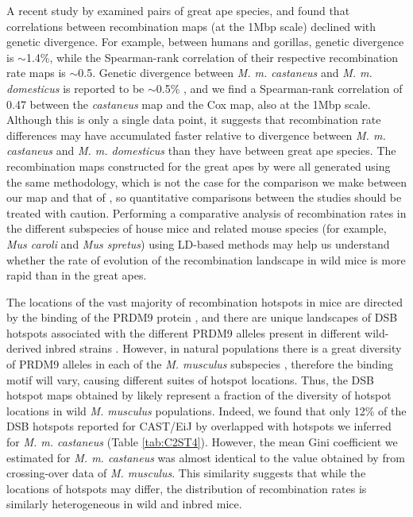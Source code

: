 A recent study by \cite{RN221} examined pairs of great ape species, and found that correlations between recombination maps (at the 1Mbp scale) declined with genetic divergence. For example, between humans and gorillas, genetic divergence is $\sim$1.4\%, while the Spearman-rank correlation of their respective recombination rate maps is $\sim$0.5. Genetic divergence between \textit{M. m. castaneus} and \textit{M. m. domesticus} is reported to be $\sim$0.5\% \citep{RN255}, and we find a Spearman-rank correlation of 0.47 between the \textit{castaneus} map and the Cox map, also at the 1Mbp scale. Although this is only a single data point, it suggests that recombination rate differences may have accumulated faster relative to divergence between \textit{M. m. castaneus} and \textit{M. m. domesticus} than they have between great ape species. The recombination maps constructed for the great apes by \cite{RN221}  were all generated using the same methodology, which is not the case for the comparison we make between our map and that of \cite{RN232}, so quantitative comparisons between the studies should be treated with caution. Performing a comparative analysis of recombination rates in the different subspecies of house mice and related mouse species (for example, \textit{Mus caroli} and \textit{Mus spretus}) using LD-based methods may help us understand whether the rate of evolution of the recombination landscape in wild mice is more rapid than in the great apes.

The locations of the vast majority of recombination hotspots in mice are directed by the binding of the PRDM9 protein \citep{RN254}, and there are unique landscapes of DSB hotspots associated with the different PRDM9 alleles present in different wild-derived inbred strains \citep{RN249}. However, in natural populations there is a great diversity of PRDM9 alleles in each of the \textit{M. musculus} subspecies \citep{RN292}, therefore the binding motif will vary, causing different suites of hotspot locations. Thus, the DSB hotspot maps obtained by \cite{RN249} likely represent a fraction of the diversity of hotspot locations in wild \textit{M. musculus} populations. Indeed, we found that only 12\% of the DSB hotspots reported for CAST/EiJ by \cite{RN249} overlapped with hotspots we inferred for \textit{M. m. castaneus} (Table \ref{tab:C2ST4}). However, the mean Gini coefficient we estimated for \textit{M. m. castaneus} was almost identical to the value obtained by \cite{RN333} from crossing-over data of \textit{M. musculus}. This similarity suggests that while the locations of hotspots may differ, the distribution of recombination rates is similarly heterogeneous in wild and inbred mice.

